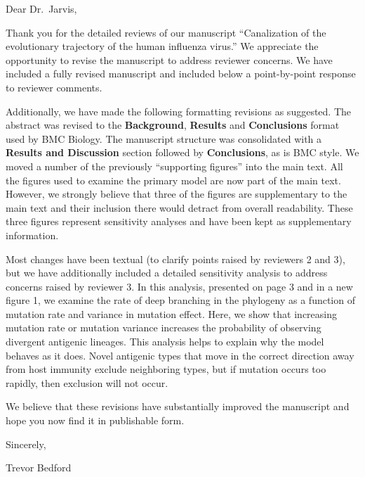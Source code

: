 \documentclass[11pt,oneside,letterpaper]{article}
\begin{document}
\setlength{\topmargin}{0.5in}
\thispagestyle{empty}

Dear Dr.\ Jarvis,

\vspace{0.5cm}

Thank you for the detailed reviews of our manuscript ``Canalization of the evolutionary trajectory of the human influenza virus.''  We appreciate the opportunity to revise the manuscript to address reviewer concerns.  We have included a fully revised manuscript and included below a point-by-point response to reviewer comments.

Additionally, we have made the following formatting revisions as suggested.  The abstract was revised to the \textbf{Background}, \textbf{Results} and \textbf{Conclusions} format used by BMC Biology.  The manuscript structure was consolidated with a \textbf{Results and Discussion} section followed by \textbf{Conclusions}, as is BMC style.  We moved a number of the previously ``supporting figures'' into the main text.  All the figures used to examine the primary model are now part of the main text.  However, we strongly believe that three of the figures are supplementary to the main text and their inclusion there would detract from overall readability.  These three figures represent sensitivity analyses and have been kept as supplementary information.

Most changes have been textual (to clarify points raised by reviewers 2 and 3), but we have additionally included a detailed sensitivity analysis to address concerns raised by reviewer 3.  In this analysis, presented on page 3 and in a new figure 1, we examine the rate of deep branching in the phylogeny as a function of mutation rate and variance in mutation effect.  Here, we show that increasing mutation rate or mutation variance increases the probability of observing divergent antigenic lineages.  This analysis helps to explain why the model behaves as it does.  Novel antigenic types that move in the correct direction away from host immunity exclude neighboring types, but if mutation occurs too rapidly, then exclusion will not occur.

We believe that these revisions have substantially improved the manuscript and hope you now find it in publishable form.

\vspace{1cm}

Sincerely,

Trevor Bedford

\pagebreak
\end{document}
